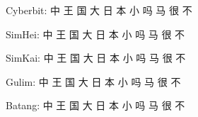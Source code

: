 \documentclass[twocolumn]{article}
\begin{document}
\begin{CJK*}{UTF8}{cyberb} \CJKtilde
Cyberbit: 中 王 国 大 日 本 小 吗 马 很 不
\end{CJK*}

\begin{CJK*}{UTF8}{simhei} \CJKtilde
SimHei: 中 王 国 大 日 本 小 吗 马 很 不
\end{CJK*}

\begin{CJK*}{UTF8}{SIMKAI} \CJKtilde
SimKai: 中 王 国 大 日 本 小 吗 马 很 不
\end{CJK*}

\begin{CJK*}{UTF8}{gulim} \CJKtilde
Gulim: 中 王 国 大 日 本 小 吗 马 很 不
\end{CJK*}

\begin{CJK*}{UTF8}{batang} \CJKtilde
Batang: 中 王 国 大 日 本 小 吗 马 很 不
\end{CJK*}



\end{document}
